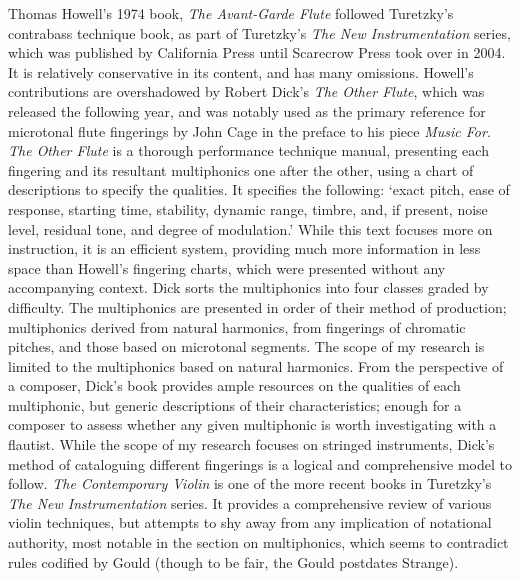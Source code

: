 Thomas Howell’s 1974 book, \textit{The Avant-Garde Flute} followed Turetzky’s contrabass technique book, as part of Turetzky’s \emph{The New Instrumentation} series, which was published by California Press until Scarecrow Press took over in 2004.\autocite[4]{fallowfieldCelloMapHandbook2009} 
It is relatively conservative in its content, and has many omissions. 
Howell’s contributions are overshadowed by Robert Dick’s \emph{The Other Flute}, which was released the following year, and was notably used as the primary reference for microtonal flute fingerings by John Cage in the preface to his piece \emph{Music For}.\autocite{cageMusicPartsVoice1984} 
\emph{The Other Flute} is a thorough performance technique manual, presenting each fingering and its resultant multiphonics one after the other, using a chart of descriptions to specify the qualities.\autocite[86--135]{dickOtherFlute1989} 
It specifies the following: ‘exact pitch, ease of response, starting time, stability, dynamic range, timbre, and, if present, noise level, residual tone, and degree of modulation.’\autocite[84]{dickOtherFlute1989} 
While this text focuses more on instruction, it is an efficient system, providing much more information in less space than Howell’s fingering charts, which were presented without any accompanying context. 
Dick sorts the multiphonics into four classes graded by difficulty. The multiphonics are presented in order of their method of production; multiphonics derived from natural harmonics, from fingerings of chromatic pitches, and those based on microtonal segments. 
The scope of my research is limited to the multiphonics based on natural harmonics. 
From the perspective of a composer, Dick’s book provides ample resources on the qualities of each multiphonic, but generic descriptions of their characteristics; enough for a composer to assess whether any given multiphonic is worth investigating with a flautist. 
While the scope of my research focuses on stringed instruments, Dick’s method of cataloguing different fingerings is a logical and comprehensive model to follow.
\emph{The Contemporary Violin} is one of the more recent books in Turetzky’s \emph{The New Instrumentation} series.\autocite[]{strangeContemporaryViolinExtended2001} 
It provides a comprehensive review of various violin techniques, but attempts to shy away from any implication of notational authority, most notable in the section on multiphonics, which seems to contradict rules codified by Gould (though to be fair, the Gould postdates Strange).\autocites[134]{strangeContemporaryViolinExtended2001}[257--258]{gouldBars2011} 
